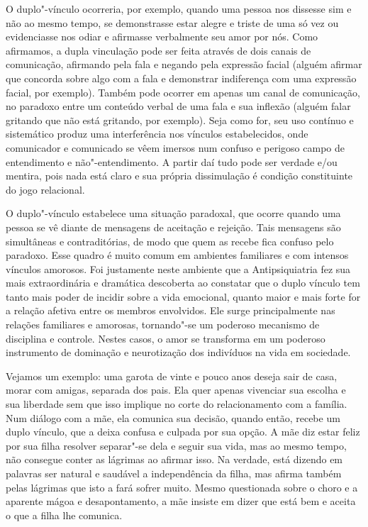 O duplo"-vínculo ocorreria, por exemplo, quando uma pessoa nos dissesse
sim e não ao mesmo tempo, se demonstrasse estar alegre e triste de uma
só vez ou evidenciasse nos odiar e afirmasse verbalmente seu amor por
nós. Como afirmamos, a dupla vinculação pode ser feita através de dois
canais de comunicação, afirmando pela fala e negando pela expressão
facial (alguém afirmar que concorda sobre algo com a fala e demonstrar
indiferença com uma expressão facial, por exemplo). Também pode ocorrer
em apenas um canal de comunicação, no paradoxo entre um conteúdo verbal
de uma fala e sua inflexão (alguém falar gritando que não está gritando,
por exemplo). Seja como for, seu uso contínuo e sistemático produz uma
interferência nos vínculos estabelecidos, onde comunicador e comunicado
se vêem imersos num confuso e perigoso campo de entendimento e
não"-entendimento. A partir daí tudo pode ser verdade e/ou mentira, pois
nada está claro e sua própria dissimulação é condição constituinte do
jogo relacional.

O duplo"-vínculo estabelece uma situação paradoxal, que ocorre quando uma
pessoa se vê diante de mensagens de aceitação e rejeição. Tais mensagens
são simultâneas e contraditórias, de modo que quem as recebe fica
confuso pelo paradoxo. Esse quadro é muito comum em ambientes familiares
e com intensos vínculos amorosos. Foi justamente neste ambiente que a
Antipsiquiatria fez sua mais extraordinária e dramática descoberta ao
constatar que o duplo vínculo tem tanto mais poder de incidir sobre a
vida emocional, quanto maior e mais forte for a relação afetiva entre os
membros envolvidos. Ele surge principalmente nas relações familiares e
amorosas, tornando"-se um poderoso mecanismo de disciplina e controle.
Nestes casos, o amor se transforma em um poderoso instrumento de
dominação e neurotização dos indivíduos na vida em sociedade.

Vejamos um exemplo: uma garota de vinte e pouco anos deseja sair de
casa, morar com amigas, separada dos pais. Ela quer apenas vivenciar sua
escolha e sua liberdade sem que isso implique no corte do relacionamento
com a família. Num diálogo com a mãe, ela comunica sua decisão, quando
então, recebe um duplo vínculo, que a deixa confusa e culpada por sua
opção. A mãe diz estar feliz por sua filha resolver separar"-se dela e
seguir sua vida, mas ao mesmo tempo, não consegue conter as lágrimas ao
afirmar isso. Na verdade, está dizendo em palavras ser natural e
saudável a independência da filha, mas afirma também pelas lágrimas que
isto a fará sofrer muito. Mesmo questionada sobre o choro e a aparente
mágoa e desapontamento, a mãe insiste em dizer que está bem e aceita o
que a filha lhe comunica.

